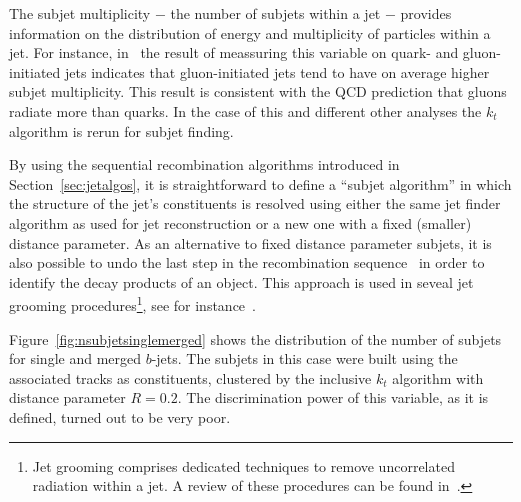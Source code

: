 The subjet multiplicity $-$ the number of subjets within a jet $-$ provides information on the distribution of energy and multiplicity of particles within a jet. For instance, in~\cite{Snihur1999494} the result of meassuring this variable on quark- and gluon-initiated jets indicates that gluon-initiated jets tend to have on average higher subjet multiplicity. This result is consistent with the QCD prediction that gluons radiate more than quarks. In the case of this and different other analyses %
the $k_t$ algorithm is rerun for subjet finding.

By using the sequential recombination algorithms introduced in Section~\ref{sec:jetalgos}, it is straightforward to define a ``subjet algorithm'' in which the structure of the jet's constituents is resolved using either the same jet finder algorithm as used for jet reconstruction or a new one with a fixed (smaller) distance parameter. 
As an alternative to fixed distance parameter subjets, it is also possible to undo the last step in the recombination sequence~\cite{kt2} in order to identify the decay products of an object.  This approach is used in seveal jet grooming procedures\footnote{Jet grooming comprises dedicated techniques to remove uncorrelated radiation within a jet. A review of these procedures can be found in~\cite{Abdesselam:2010pt}. }, see for instance~\cite{pruning}.


Figure~\ref{fig:nsubjetsinglemerged} shows the distribution of the number of subjets for single and merged $b$-jets. The subjets in this case were built using the associated tracks as constituents, clustered by the inclusive $k_t$ algorithm with distance parameter $R=0.2$. The discrimination power of this variable, as it is defined, turned out to be very poor.
\vspace{3 mm}

